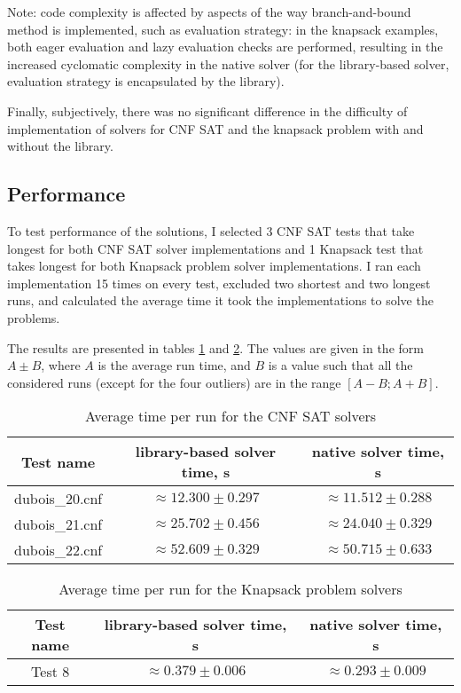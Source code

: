 Note: code complexity is affected by aspects of the way branch-and-bound method
is implemented, such as evaluation strategy: in the knapsack examples, both eager evaluation
and lazy evaluation checks are performed, resulting in the increased cyclomatic complexity
in the native solver (for the library-based solver, evaluation strategy is encapsulated
by the library).

Finally, subjectively, there was no significant difference in the difficulty of
implementation of solvers for CNF SAT and the knapsack problem with and without the library.

\subsection{Performance}

To test performance of the solutions, I selected 3 CNF SAT tests that take longest for
both CNF SAT solver implementations and 1 Knapsack test that takes longest for both
Knapsack problem solver implementations.
I ran each implementation 15 times on every test, excluded two shortest and two longest
runs, and calculated the average time it took the implementations to solve the problems.

The results are presented in tables \ref{tab:perf_cnfsat} and \ref{tab:perf_knapsack}.
The values are given in the form $A\pm B$, where $A$ is the average run time,
and $B$ is a value such that all the considered runs (except for the four outliers) are in
the range $[A - B; A + B]$.

\begin{table}[h]
 \centering
 \caption{Average time per run for the CNF SAT solvers}
 \label{tab:perf_cnfsat}

 \begin{tabular}{|ccc|}
  \hline
  Test name & library-based solver time, s & native solver time, s \\
  \hline
  dubois\_20.cnf & $\approx 12.300\pm 0.297$ & $\approx 11.512\pm 0.288$ \\
  dubois\_21.cnf & $\approx 25.702\pm 0.456$ & $\approx 24.040\pm 0.329$ \\
  dubois\_22.cnf & $\approx 52.609\pm 0.329$ & $\approx 50.715\pm 0.633$ \\
  \hline
 \end{tabular}
\end{table}

\begin{table}[h]
 \centering
 \caption{Average time per run for the Knapsack problem solvers}
 \label{tab:perf_knapsack}

 \begin{tabular}{|ccc|}
  \hline
  Test name & library-based solver time, s & native solver time, s \\
  \hline
  Test 8 & $\approx 0.379\pm 0.006$ & $\approx 0.293\pm 0.009$ \\
  \hline
 \end{tabular}
\end{table}

